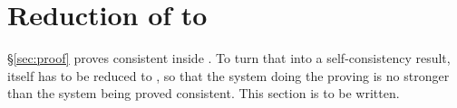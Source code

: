 \section{Reduction of \QGA{} to \BGA}
\label{sec:reduction}

\S\ref{sec:proof} proves \BGA{} consistent inside \QGA.  To turn that into a
self-consistency result, \QGA{} itself has to be reduced to \BGA, so that the
system doing the proving is no stronger than the system being proved
consistent.  This section is to be written.
